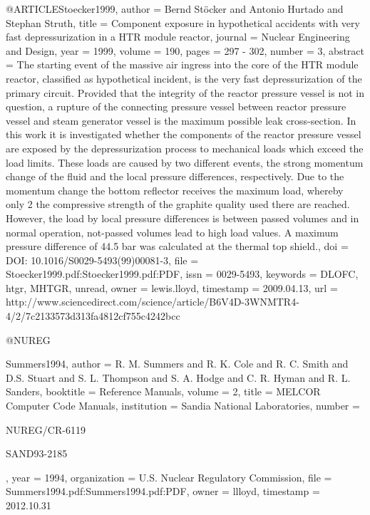 {{@ARTICLE{Stoecker1999,
  author = {Bernd Stöcker and Antonio Hurtado and Stephan Struth},
  title = {Component exposure in hypothetical accidents with very fast depressurization
	in a HTR module reactor},
  journal = {Nuclear Engineering and Design},
  year = {1999},
  volume = {190},
  pages = {297 - 302},
  number = {3},
  abstract = {The starting event of the massive air ingress into the core of the
	HTR module reactor, classified as hypothetical incident, is the very
	fast depressurization of the primary circuit. Provided that the integrity
	of the reactor pressure vessel is not in question, a rupture of the
	connecting pressure vessel between reactor pressure vessel and steam
	generator vessel is the maximum possible leak cross-section. In this
	work it is investigated whether the components of the reactor pressure
	vessel are exposed by the depressurization process to mechanical
	loads which exceed the load limits. These loads are caused by two
	different events, the strong momentum change of the fluid and the
	local pressure differences, respectively. Due to the momentum change
	the bottom reflector receives the maximum load, whereby only 2%
	the compressive strength of the graphite quality used there are reached.
	However, the load by local pressure differences is between passed
	volumes and in normal operation, not-passed volumes lead to high
	load values. A maximum pressure difference of 44.5 bar was calculated
	at the thermal top shield.},
  doi = {DOI: 10.1016/S0029-5493(99)00081-3},
  file = {Stoecker1999.pdf:Stoecker1999.pdf:PDF},
  issn = {0029-5493},
  keywords = {DLOFC, htgr, MHTGR, unread},
  owner = {lewis.lloyd},
  timestamp = {2009.04.13},
  url = {http://www.sciencedirect.com/science/article/B6V4D-3WNMTR4-4/2/7c2133573d313fa4812cf755c4242bcc}
}

@NUREG{Summers1994,
  author = {R. M. Summers and R. K. Cole and R. C. Smith and D.S. Stuart and
	S. L. Thompson and S. A. Hodge and C. R. Hyman and R. L. Sanders},
  booktitle = {Reference Manuals},
  volume = {2},
  title = {{MELCOR} Computer Code Manuals},
  institution = {Sandia National Laboratories},
  number = {NUREG/CR-6119
	
	SAND93-2185},
  year = {1994},
  organization = {U.S. Nuclear Regulatory Commission},
  file = {Summers1994.pdf:Summers1994.pdf:PDF},
  owner = {llloyd},
  timestamp = {2012.10.31}
}

}}
